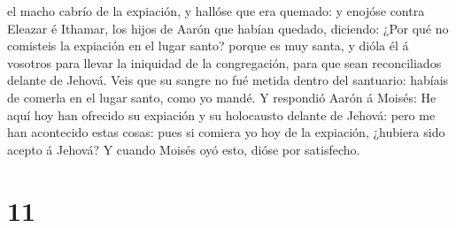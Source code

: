 el macho cabrío de la expiación, y hallóse que era quemado: y enojóse
contra Eleazar é Ithamar, los hijos de Aarón que habían quedado,
diciendo:  ¿Por qué no comisteis la expiación en el lugar
santo? porque es muy santa, y dióla él á vosotros para llevar la
iniquidad de la congregación, para que sean reconciliados delante de
Jehová.  Veis que su sangre no fué metida dentro del
santuario: habíais de comerla en el lugar santo, como yo mandé.
 Y respondió Aarón á Moisés: He aquí hoy han ofrecido su
expiación y su holocausto delante de Jehová: pero me han acontecido
estas cosas: pues si comiera yo hoy de la expiación, ¿hubiera sido
acepto á Jehová?  Y cuando Moisés oyó esto, dióse por
satisfecho.

\hypertarget{section-10}{%
\section{11}\label{section-10}}

